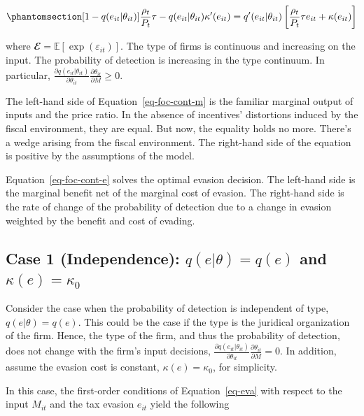 \documentclass[
  12pt]{article}
\theoremstyle{definition}
\theoremstyle{remark}
\begin{document}
\begin{equation}\phantomsection\label{eq-foc-cont-e}{
[1-q(e_{it}|\theta_{it})]\frac{\rho_t}{P_t}\tau-q(e_{it}|\theta_{it})\kappa'(e_{it})=q'(e_{it}|\theta_{it})\left[\frac{\rho_t}{P_t}\tau e_{it} + \kappa(e_{it})\right]
}\end{equation}

where \(\mathbfcal{E}=\mathbb{E}[\exp(\varepsilon_{it})]\). The type of
firms is continuous and increasing on the input. The probability of
detection is increasing in the type continuum. In particular,
\(\frac{\partial q(e_{it}|\theta_{it})}{\partial \theta_{it}}\frac{\partial \theta_{it}}{\partial M}\ge0\).

The left-hand side of Equation~\ref{eq-foc-cont-m} is the familiar
marginal output of inputs and the price ratio. In the absence of
incentives' distortions induced by the fiscal environment, they are
equal. But now, the equality holds no more. There's a wedge arising from
the fiscal environment. The right-hand side of the equation is positive
by the assumptions of the model.

Equation~\ref{eq-foc-cont-e} solves the optimal evasion decision. The
left-hand side is the marginal benefit net of the marginal cost of
evasion. The right-hand side is the rate of change of the probability of
detection due to a change in evasion weighted by the benefit and cost of
evading.

\subsection{\texorpdfstring{Case 1 (Independence): \(q(e|\theta)=q(e)\)
and
\(\kappa(e)=\kappa_0\)}{Case 1 (Independence): q(e\textbar\textbackslash theta)=q(e) and \textbackslash kappa(e)=\textbackslash kappa\_0}}\label{case-1-independence-qethetaqe-and-kappaekappa_0}

Consider the case when the probability of detection is independent of
type, \(q(e|\theta)=q(e)\). This could be the case if the type is the
juridical organization of the firm. Hence, the type of the firm, and
thus the probability of detection, does not change with the firm's input
decisions,
\(\frac{\partial q(e_{it}|\theta_{it})}{\partial \theta_{it}}\frac{\partial \theta_{it}}{\partial M}=0\).
In addition, assume the evasion cost is constant,
\(\kappa(e)=\kappa_0\), for simplicity.

In this case, the first-order conditions of Equation~\ref{eq-eva} with
respect to the input \(M_{it}\) and the tax evasion \(e_{it}\) yield the
following
\end{document}
